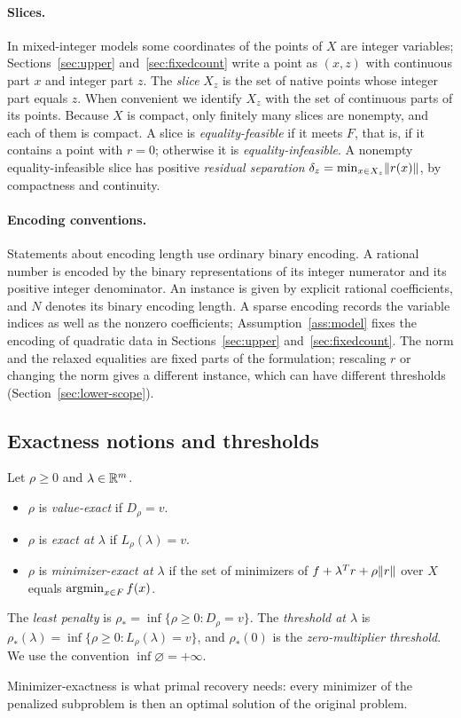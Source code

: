\paragraph{Slices.}
In mixed-integer models some coordinates of the points of $X$ are
integer variables; Sections~\ref{sec:upper} and~\ref{sec:fixedcount}
write a point as $(x,z)$ with continuous part $x$ and integer part $z$.
The \emph{slice} $X_z$ is the set of native points whose integer part
equals $z$. When convenient we identify $X_z$ with the set of continuous
parts of its points. Because $X$ is compact, only finitely many slices
are nonempty, and each of them is compact. A slice is
\emph{equality-feasible} if it meets $F$, that is, if it contains a
point with $r=0$; otherwise it is \emph{equality-infeasible}. A nonempty
equality-infeasible slice has positive \emph{residual separation}
$\delta_z=\min_{x\in X_z}\lVert r(x)\rVert$, by compactness and continuity.

\paragraph{Encoding conventions.}
Statements about encoding length use ordinary binary encoding. A
rational number is encoded by the binary representations of its integer
numerator and its positive integer denominator. An instance is given by
explicit rational coefficients, and $N$ denotes its binary encoding
length. A sparse encoding records the variable indices as well as the
nonzero coefficients; Assumption~\ref{ass:model} fixes the encoding of
quadratic data in Sections~\ref{sec:upper} and~\ref{sec:fixedcount}.
The norm and the relaxed equalities are fixed parts of the formulation;
rescaling $r$ or changing the norm gives a different instance, which can
have different thresholds (Section~\ref{sec:lower-scope}).

\subsection{Exactness notions and thresholds}
\begin{definition}\label{def:exactness}
Let $\rho\ge0$ and $\lambda\in\mathbb R^m$.
\begin{itemize}
\item $\rho$ is \emph{value-exact} if $D_\rho=v$.
\item $\rho$ is \emph{exact at $\lambda$} if $L_\rho(\lambda)=v$.
\item $\rho$ is \emph{minimizer-exact at $\lambda$} if the set of
 minimizers of $f+\lambda^Tr+\rho\lVert r\rVert$ over $X$ equals
 $\operatorname{argmin}_{x\in F}f(x)$.
\end{itemize}
The \emph{least penalty} is $\rho_*=\inf\{\rho\ge0:D_\rho=v\}$. The
\emph{threshold at $\lambda$} is
$\rho_*(\lambda)=\inf\{\rho\ge0:L_\rho(\lambda)=v\}$, and $\rho_*(0)$ is
the \emph{zero-multiplier threshold}. We use the convention
$\inf\varnothing=+\infty$.
\end{definition}
Minimizer-exactness is what primal recovery needs: every minimizer of the penalized subproblem is then an
optimal solution of the original problem.

